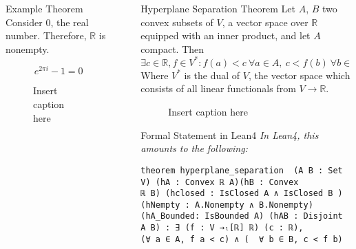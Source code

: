 \documentclass[final]{beamer}
\newlength{\sepwidth}
\newlength{\colwidth}
\newcommand{\separatorcolumn}{\begin{column}{\sepwidth}\end{column}}
\begin{document}
\begin{frame}[fragile]
\begin{columns}[t]
\begin{column}{\colwidth}
\begin{block*}
                
          
                \begin{alertblock}{Example Theorem}
                    Consider 0, the real number. Therefore, $\mathbb{R}$ is nonempty. 
                \end{alertblock}

                \begin{equation}
                    e^{2\pi i} - 1 = 0
                \end{equation}
                  
                \begin{figure}[htbp]
                    \centering
                    
                    \caption{Insert caption here\label{fig:caratheodory}}
                \end{figure}
            \end{block*}

            
        \end{column}

        \separatorcolumn

        \begin{column}{\colwidth}

            
            \begin{alertblock}{Hyperplane Separation Theorem}
                Let $A$, $B$ two convex subsets of $V$, a vector space over $\mathbb{R}$ equipped with an inner product, and let $A$ compact. Then \begin{equation}
                    \exists c\in \mathbb{R}, f \in V^*: f(a) < c\ \forall a\in A, \ c < f(b)\ \forall b\in B
                  \end{equation} Where $V^*$ is the dual of $V$, the vector space which consists of all linear functionals from $V\to \mathbb{R}$.
            \end{alertblock}

            \begin{figure}[htbp]
                \centering
                
                \caption{Insert caption here\label{fig:hyperplane-separation}}
            \end{figure}

\begin{block}{Formal Statement in Lean4}
\textit{In Lean4, this amounts to the following: }
\begin{verbatim}
theorem hyperplane_separation  (A B : Set V) (hA : Convex ℝ A)(hB : Convex 
ℝ B) (hclosed : IsClosed A ∧ IsClosed B )(hNempty : A.Nonempty ∧ B.Nonempty) 
(hA_Bounded: IsBounded A) (hAB : Disjoint A B) : ∃ (f : V →ₗ[ℝ] ℝ) (c : ℝ),
(∀ a ∈ A, f a < c) ∧ (  ∀ b ∈ B, c < f b)
\end{verbatim}
\end{block}


\end{column}
\end{columns}
\end{frame}
\end{document}
